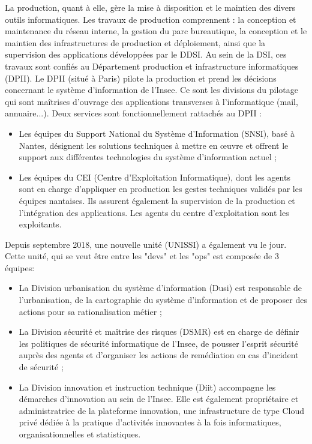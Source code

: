 \documentclass[11pt,fleqn]{book} %
\begin{document}
La production, quant à elle, gère la mise à disposition et le maintien des divers outils informatiques. Les travaux de production comprennent : la conception et maintenance du réseau interne, la gestion du parc bureautique, la conception et le maintien des infrastructures de production et déploiement, ainsi que la supervision des applications développées par le DDSI. Au sein de la DSI, ces travaux sont confiés au Département production et infrastructure informatiques (DPII). Le DPII (situé à Paris) pilote la production et prend les décisions concernant le système d’information de l’Insee. Ce sont les divisions du pilotage qui sont maîtrises d’ouvrage des applications transverses à l’informatique (mail, annuaire...). Deux services sont fonctionnellement rattachés au DPII :
\begin{itemize}
    \item Les équipes du Support National du Système d’Information (SNSI), basé à Nantes, désignent les solutions techniques à mettre en œuvre et offrent le support aux différentes technologies du système d’information actuel ;
    \item Les équipes du CEI (Centre d’Exploitation Informatique), dont les agents sont en charge d’appliquer en production les gestes techniques validés par les équipes nantaises. Ils assurent également la supervision de la production et l’intégration des applications. Les agents du centre d’exploitation sont les exploitants.\\
\end{itemize}

Depuis septembre 2018, une nouvelle unité (UNISSI) a également vu le jour. Cette unité, qui se veut être entre les "devs" et les "ops" est composée de 3 équipes: 
\begin{itemize}
    \item La Division urbanisation du système d’information (Dusi) est responsable de l’urbanisation, de la cartographie du système d’information et de proposer des actions pour sa rationalisation métier ;
    \item La Division sécurité et maîtrise des risques (DSMR) est en charge de définir les politiques de sécurité informatique de l’Insee, de pousser l’esprit sécurité auprès des agents et d’organiser les actions de remédiation en cas d’incident de sécurité ;
    \item La Division innovation et instruction technique (Diit) accompagne les démarches d’innovation au sein de l’Insee. Elle est également propriétaire et administratrice de la plateforme innovation, une infrastructure de type Cloud privé dédiée à la pratique d’activités innovantes à la fois informatiques, organisationnelles et statistiques.\\
\end{itemize}
\end{document}
